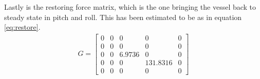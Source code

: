 Lastly is the restoring force matrix, which is the one bringing the vessel back to steady state in pitch and roll. This has been estimated to be as in equation \ref{eq:restore}.
\begin{align}
G = 
\begin{bmatrix}
0 & 0 & 0 & 0 & 0\\
0 & 0 & 0 & 0 & 0\\
0 & 0 & 6.9736 & 0 & 0\\
0 & 0 & 0 & 131.8316 & 0\\
0 & 0 & 0 & 0 & 0
\end{bmatrix}
\label{eq:restore}
\end{align}
